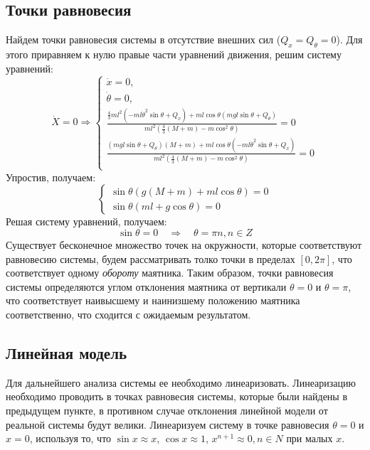 \subsection{Точки равновесия}
Найдем точки равновесия системы в отсутствие внешних сил ($Q_x = Q_{\theta} = 0$). 
Для этого приравняем к нулю правые части уравнений движения, решим систему уравнений:
\begin{equation}
    \dot{X} = 0 \Rightarrow 
    \begin{cases}
        \dot{x} = 0, \\
        \dot{\theta} = 0, \\
        \frac{\frac{4}{3}ml^2(-ml\dot{\theta}^2\sin\theta + Q_x) + ml\cos\theta(mgl\sin\theta + Q_{\theta}) }{ml^2(\frac{4}{3}(M + m) - m\cos^2\theta)} = 0 \\
        \frac{(mgl\sin\theta + Q_{\theta})(M + m) + ml\cos\theta(-ml\dot{\theta}^2\sin\theta + Q_x) }{ml^2(\frac{4}{3}(M + m) - m\cos^2\theta)}  = 0 \\ 
    \end{cases}
\end{equation}
Упростив, получаем: 
\begin{equation}
    \begin{cases}
        \sin\theta(g(M + m) + ml\cos\theta) = 0 \\ 
        \sin\theta(ml + g\cos\theta) = 0
    \end{cases}
\end{equation}
Решая систему уравнений, получаем:
\begin{equation}
    \sin\theta = 0 \quad\Rightarrow\quad \theta = \pi n, n \in Z
\end{equation}
Существует бесконечное множество точек на окружности, которые соответствуют равновесию системы, будем рассматривать толко 
точки в пределах $[0, 2\pi]$, что соответствует одному \textit{обороту} маятника.
Таким образом, точки равновесия системы определяются углом отклонения маятника от вертикали $\theta = 0$ и $\theta = \pi$, 
что соответствует наивысшему и наинизшему положению маятника соответственно, что сходится с ожидаемым результатом. 

\subsection{Линейная модель}
Для дальнейшего анализа системы ее необходимо линеаризовать. Линеаризацию необходимо проводить в точках равновесия 
системы, которые были найдены в предыдущем пункте, в противном случае отклонения линейной модели от реальной системы будут велики. 
Линеаризуем систему в точке равновесия $\theta = 0$ и $x = 0$, используя то, что $\sin x \approx x$, $\cos x \approx 1$, $x^{n + 1} \approx 0, n \in N$ 
при малых $x$. 

